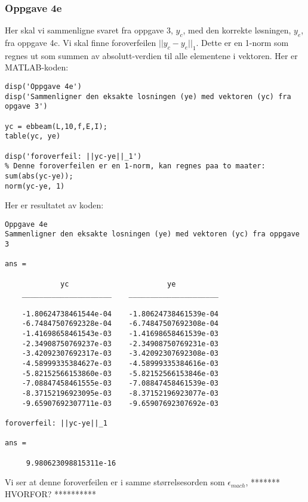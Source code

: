 \subsubsection{Oppgave 4e}
Her skal vi sammenligne svaret fra oppgave 3, $y_c$, med den korrekte løsningen, $y_e$, fra oppgave 4c. Vi skal finne foroverfeilen $||y_c-y_e||_1$. Dette er en 1-norm som regnes ut som summen av absolutt-verdien til alle elementene i vektoren. Her er MATLAB-koden:
\begin{lstlisting}
disp('Oppgave 4e')
disp('Sammenligner den eksakte losningen (ye) med vektoren (yc) fra opgave 3')

yc = ebbeam(L,10,f,E,I);
table(yc, ye)

disp('foroverfeil: ||yc-ye||_1')
% Denne foroverfeilen er en 1-norm, kan regnes paa to maater:
sum(abs(yc-ye));
norm(yc-ye, 1)
\end{lstlisting}
Her er resultatet av koden:
\begin{lstlisting}
Oppgave 4e
Sammenligner den eksakte losningen (ye) med vektoren (yc) fra oppgave 3

ans = 

             yc                       ye          
    _____________________    _____________________

    -1.80624738461544e-04    -1.80624738461539e-04
    -6.74847507692328e-04    -6.74847507692308e-04
    -1.41698658461543e-03    -1.41698658461539e-03
    -2.34908750769237e-03    -2.34908750769231e-03
    -3.42092307692317e-03    -3.42092307692308e-03
    -4.58999335384627e-03    -4.58999335384616e-03
    -5.82152566153860e-03    -5.82152566153846e-03
    -7.08847458461555e-03    -7.08847458461539e-03
    -8.37152196923095e-03    -8.37152196923077e-03
    -9.65907692307711e-03    -9.65907692307692e-03

foroverfeil: ||yc-ye||_1

ans =

     9.980623098815311e-16
\end{lstlisting}
Vi ser at denne foroverfeilen er i samme størrelsesorden som $\epsilon_{mach}$, ******* HVORFOR? **********

